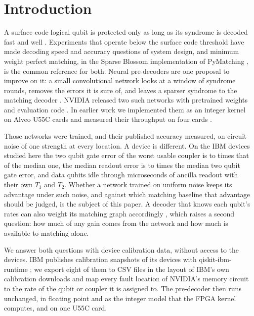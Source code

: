 \section{Introduction}\label{sec:intro}

A surface code logical qubit is protected only as long as its syndrome is decoded fast and well
\cite{dennis2002topological,fowler2012surface}. Experiments that operate below the surface code threshold
\cite{google2023scaling,google2025below} have made decoding speed and accuracy questions of system design, and
minimum weight perfect matching, in the Sparse Blossom implementation of PyMatching
\cite{higgott2022pymatching,higgott2025sparse}, is the common reference for both. Neural pre-decoders are one proposal
to improve on it: a small convolutional network looks at a window of syndrome rounds, removes the errors it is sure
of, and leaves a sparser syndrome to the matching decoder
\cite{chamberland2018deep,chamberland2026predecoder}. NVIDIA released two such networks with pretrained weights and
evaluation code \cite{chamberland2026predecoder,nvidia_fast_card,nvidia_ising_code}. In earlier work we implemented them
as an integer kernel on Alveo U55C cards and measured their throughput on four cards \cite{ali2026nodes}.

Those networks were trained, and their published accuracy measured, on circuit noise of one strength at every
location. A device is different. On the IBM devices studied here the two qubit gate error of the worst usable coupler
is \WorstCouplerMin{} to \WorstCouplerMax{} times that of the median one, the median readout error is
\ReadoutOverGateMin{} to \ReadoutOverGateMax{} times the median two qubit gate error, and data qubits idle through
microseconds of ancilla readout with their own $T_1$ and $T_2$. Whether a network trained on uniform noise keeps its
advantage under such noise, and against which matching baseline that advantage should be judged, is the subject of
this paper. A decoder that knows each qubit's rates can also weight its matching graph accordingly
\cite{sivak2024priors}, which raises a second question: how much of any gain comes from the network and how much is
available to matching alone.

We answer both questions with device calibration data, without access to the devices. IBM publishes calibration
snapshots of its devices with qiskit-ibm-runtime \cite{qiskit_ibm_runtime}; we export eight of them to CSV files in the
layout of IBM's own calibration downloads and map every fault location of NVIDIA's memory circuit to the rate of the
qubit or coupler it is assigned to. The pre-decoder then runs unchanged, in floating point and as the integer model
that the FPGA kernel computes, and on one U55C card.


